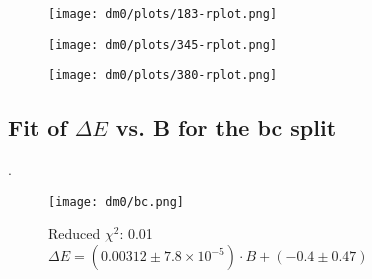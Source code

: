 \documentclass{amsart}
\begin{document}
\begin{figure}
\centering
\texttt{[image: dm0/plots/183-rplot.png]}
\end{figure}
\vspace{10pt}

\begin{figure}
\centering
\texttt{[image: dm0/plots/345-rplot.png]}
\end{figure}
\vspace{10pt}

\begin{figure}
\centering
\texttt{[image: dm0/plots/380-rplot.png]}
\end{figure}
\vspace{10pt}
\FloatBarrier
\subsection{Fit of $\Delta E$ vs. B for the bc split}
.

\begin{figure}
\centering
\texttt{[image: dm0/bc.png]}
\caption{Reduced $\chi^2$: 0.01\\$\Delta E=(0.00312\pm7.8\times10^{-5})\cdot B + (-0.4\pm0.47)$}
\end{figure}
\vspace{10pt}
\end{document}
